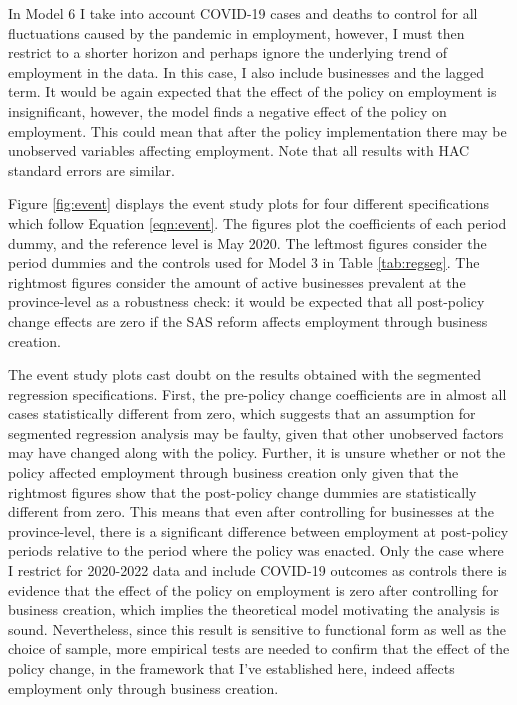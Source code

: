 \documentclass[11pt,a4paper]{article}\usepackage[]{graphicx}\usepackage[]{xcolor}
\begin{document}
In Model 6 I take into account COVID-19 cases and deaths to control for all fluctuations caused by the pandemic in employment, however, I must then restrict to a shorter horizon and perhaps ignore the underlying trend of employment in the data. In this case, I also include businesses and the lagged term. It would be again expected that the effect of the policy on employment is insignificant, however, the model finds a negative effect of the policy on employment. This could mean that after the policy implementation there may be unobserved variables affecting employment. Note that all results with HAC standard errors are similar. 

Figure \ref{fig:event} displays the event study plots for four different specifications which follow Equation \ref{eqn:event}. The figures plot the coefficients of each period dummy, and the reference level is May 2020. The leftmost figures consider the period dummies and the controls used for Model 3 in Table \ref{tab:regseg}. The rightmost figures consider the amount of active businesses prevalent at the province-level as a robustness check: it would be expected that all post-policy change effects are zero if the SAS reform affects employment through business creation. 

The event study plots cast doubt on the results obtained with the segmented regression specifications. First, the pre-policy change coefficients are in almost all cases statistically different from zero, which suggests that an assumption for segmented regression analysis may be faulty, given that other unobserved factors may have changed along with the policy. Further, it is unsure whether or not the policy affected employment through business creation only given that the rightmost figures show that the post-policy change dummies are statistically different from zero. This means that even after controlling for businesses at the province-level, there is a significant difference between employment at post-policy periods relative to the period where the policy was enacted. Only the case where I restrict for 2020-2022 data and include COVID-19 outcomes as controls there is evidence that the effect of the policy on employment is zero after controlling for business creation, which implies the theoretical model motivating the analysis is sound. Nevertheless, since this result is sensitive to functional form as well as the choice of sample, more empirical tests are needed to confirm that the effect of the policy change, in the framework that I've established here, indeed affects employment only through business creation.
\end{document}

